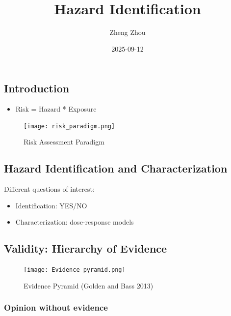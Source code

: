 \documentclass[
  letterpaper,
  DIV=11,
  numbers=noendperiod]{scrartcl}
\title{Hazard Identification}
\author{Zheng Zhou}
\date{2025-09-12}
\providecommand{\tightlist}{%
  \setlength{\itemsep}{0pt}\setlength{\parskip}{0pt}}\usepackage{longtable,booktabs,array}
\begin{document}
\maketitle


\subsection{Introduction}\label{introduction}

\begin{itemize}
\tightlist
\item
  Risk = Hazard * Exposure
\end{itemize}

\begin{figure}[H]

{\centering \texttt{[image: risk\_paradigm.png]}

}

\caption{Risk Assessment Paradigm}

\end{figure}%

\subsection{Hazard Identification and
Characterization}\label{hazard-identification-and-characterization}

Different questions of interest:

\begin{itemize}
\item
  Identification: YES/NO
\item
  Characterization: dose-response models
\end{itemize}

\subsection{Validity: Hierarchy of
Evidence}\label{validity-hierarchy-of-evidence}

\begin{figure}[H]

{\centering \texttt{[image: Evidence\_pyramid.png]}

}

\caption{Evidence Pyramid (Golden and Bass 2013)}

\end{figure}%

\subsubsection{Opinion without evidence}\label{opinion-without-evidence}
\end{document}
